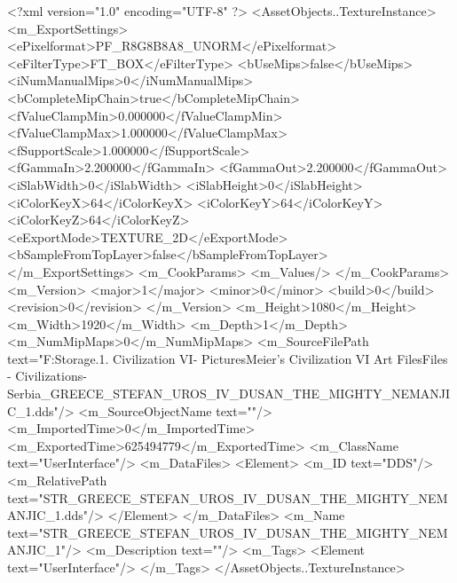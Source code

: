 <?xml version="1.0" encoding="UTF-8" ?>
<AssetObjects..TextureInstance>
	<m_ExportSettings>
		<ePixelformat>PF_R8G8B8A8_UNORM</ePixelformat>
		<eFilterType>FT_BOX</eFilterType>
		<bUseMips>false</bUseMips>
		<iNumManualMips>0</iNumManualMips>
		<bCompleteMipChain>true</bCompleteMipChain>
		<fValueClampMin>0.000000</fValueClampMin>
		<fValueClampMax>1.000000</fValueClampMax>
		<fSupportScale>1.000000</fSupportScale>
		<fGammaIn>2.200000</fGammaIn>
		<fGammaOut>2.200000</fGammaOut>
		<iSlabWidth>0</iSlabWidth>
		<iSlabHeight>0</iSlabHeight>
		<iColorKeyX>64</iColorKeyX>
		<iColorKeyY>64</iColorKeyY>
		<iColorKeyZ>64</iColorKeyZ>
		<eExportMode>TEXTURE_2D</eExportMode>
		<bSampleFromTopLayer>false</bSampleFromTopLayer>
	</m_ExportSettings>
	<m_CookParams>
		<m_Values/>
	</m_CookParams>
	<m_Version>
		<major>1</major>
		<minor>0</minor>
		<build>0</build>
		<revision>0</revision>
	</m_Version>
	<m_Height>1080</m_Height>
	<m_Width>1920</m_Width>
	<m_Depth>1</m_Depth>
	<m_NumMipMaps>0</m_NumMipMaps>
	<m_SourceFilePath text="F:\Mod Storage\2.1. Civilization VI\Mods\Archive - Pictures\Sid Meier's Civilization VI Art Files\Art Files - Civilizations\Civilization - Serbia\STR_GREECE_STEFAN_UROS_IV_DUSAN_THE_MIGHTY_NEMANJIC_1.dds"/>
	<m_SourceObjectName text=""/>
	<m_ImportedTime>0</m_ImportedTime>
	<m_ExportedTime>625494779</m_ExportedTime>
	<m_ClassName text="UserInterface"/>
	<m_DataFiles>
		<Element>
			<m_ID text="DDS"/>
			<m_RelativePath text="STR_GREECE_STEFAN_UROS_IV_DUSAN_THE_MIGHTY_NEMANJIC_1.dds"/>
		</Element>
	</m_DataFiles>
	<m_Name text="STR_GREECE_STEFAN_UROS_IV_DUSAN_THE_MIGHTY_NEMANJIC_1"/>
	<m_Description text=""/>
	<m_Tags>
		<Element text="UserInterface"/>
	</m_Tags>
</AssetObjects..TextureInstance>

